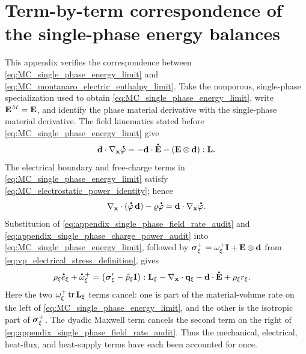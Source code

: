 \section{Term-by-term correspondence of the single-phase energy balances}
\label{app:single_phase_energy_audit}

This appendix verifies the correspondence between
\eqref{eq:MC_single_phase_energy_limit} and
\eqref{eq:MC_montanaro_electric_enthalpy_limit}.  Take the nonporous,
single-phase specialization used to obtain
\eqref{eq:MC_single_phase_energy_limit}, write
\(\mathbf{E}^{M}=\mathbf{E}\), and identify the phase material derivative with the
single-phase material derivative.  The field kinematics stated before
\eqref{eq:MC_single_phase_energy_limit} give
%
\begin{equation}
\mbf d\cdot\nabla_{\mbf x}\phasedot\varphi
=
-\mbf d\cdot\phasedot{\mbf E}
-
\left(
\mbf E\otimes\mbf d
\right):\mbf L.
\label{eq:appendix_single_phase_field_rate_audit}
\end{equation}
%
The electrical boundary and free-charge terms in
\eqref{eq:MC_single_phase_energy_limit} satisfy
\eqref{eq:MC_electrostatic_power_identity}; hence
%
\begin{equation}
\nabla_{\mbf x}\cdot
\left(
\phasedot\varphi\,\mbf d
\right)
-
\varrho\phasedot\varphi
=
\mbf d\cdot\nabla_{\mbf x}\phasedot\varphi.
\label{eq:appendix_single_phase_charge_power_audit}
\end{equation}
%
Substitution of
\eqref{eq:appendix_single_phase_field_rate_audit} and
\eqref{eq:appendix_single_phase_charge_power_audit} into
\eqref{eq:MC_single_phase_energy_limit}, followed by
\(\boldsymbol{\sigma}_\xi^+=\omega_\xi^+\mathbf{I}+\mathbf{E}\otimes\mathbf{d}\) from
\eqref{eq:vp_electrical_stress_definition}, gives
%
\begin{align}
\rho_\xi\phasedot e_\xi
+\phasedot\omega_\xi^+
&=
\left(
\bs\sigma_\xi'-\bar p_\xi\mbf I
\right):\mbf L_\xi
-\nabla_{\mbf x}\cdot\mbf q_\xi
-\mbf d\cdot\phasedot{\mbf E}
+\rho_\xi r_\xi.
\label{eq:appendix_single_phase_electric_enthalpy_audit}
\end{align}
%
Here the two \(\omega_\xi^+\operatorname{tr}\mathbf{L}_\xi\) terms cancel:
one is part of the material-volume rate on the left of
\eqref{eq:MC_single_phase_energy_limit}, and the other is the isotropic part
of \(\boldsymbol{\sigma}_\xi^+\).  The dyadic Maxwell term cancels the second term on
the right of \eqref{eq:appendix_single_phase_field_rate_audit}.  Thus the
mechanical, electrical, heat-flux, and heat-supply terms have each been
accounted for once.

